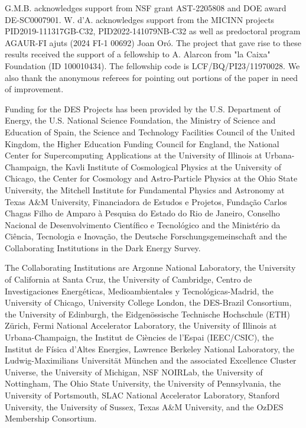 \documentclass[onecolumn,resetfootnote]{aastex7}
\begin{document}
  \begin{acknowledgments}
G.M.B. acknowledges support from NSF grant AST-2205808 and DOE award DE-SC0007901.
W. d’A. acknowledges support from the  MICINN projects PID2019-111317GB-C32, PID2022-141079NB-C32 as well as predoctoral program AGAUR-FI ajuts (2024 FI-1 00692) Joan Or\'o.
The project that gave rise to these results received the support of a fellowship
to A. Alarcon from "la Caixa" Foundation (ID 100010434). The fellowship code is
LCF/BQ/PI23/11970028.  We also thank the anonymous referees for pointing out
portions of the paper in need of improvement.

Funding for the DES Projects has been provided by the U.S. Department of Energy, the U.S. National Science Foundation, the Ministry of Science and Education of Spain, 
the Science and Technology Facilities Council of the United Kingdom, the Higher Education Funding Council for England, the National Center for Supercomputing 
Applications at the University of Illinois at Urbana-Champaign, the Kavli Institute of Cosmological Physics at the University of Chicago, 
the Center for Cosmology and Astro-Particle Physics at the Ohio State University,
the Mitchell Institute for Fundamental Physics and Astronomy at Texas A\&M University, Financiadora de Estudos e Projetos, 
Funda{\c c}{\~a}o Carlos Chagas Filho de Amparo {\`a} Pesquisa do Estado do Rio de Janeiro, Conselho Nacional de Desenvolvimento Cient{\'i}fico e Tecnol{\'o}gico and 
the Minist{\'e}rio da Ci{\^e}ncia, Tecnologia e Inova{\c c}{\~a}o, the Deutsche Forschungsgemeinschaft and the Collaborating Institutions in the Dark Energy Survey. 

The Collaborating Institutions are Argonne National Laboratory, the University of California at Santa Cruz, the University of Cambridge, Centro de Investigaciones Energ{\'e}ticas, 
Medioambientales y Tecnol{\'o}gicas-Madrid, the University of Chicago, University College London, the DES-Brazil Consortium, the University of Edinburgh, 
the Eidgen{\"o}ssische Technische Hochschule (ETH) Z{\"u}rich, 
Fermi National Accelerator Laboratory, the University of Illinois at Urbana-Champaign, the Institut de Ci{\`e}ncies de l'Espai (IEEC/CSIC), 
the Institut de F{\'i}sica d'Altes Energies, Lawrence Berkeley National Laboratory, the Ludwig-Maximilians Universit{\"a}t M{\"u}nchen and the associated Excellence Cluster Universe, 
the University of Michigan, NSF NOIRLab, the University of Nottingham, The Ohio State University, the University of Pennsylvania, the University of Portsmouth, 
SLAC National Accelerator Laboratory, Stanford University, the University of Sussex, Texas A\&M University, and the OzDES Membership Consortium.


\end{acknowledgments}
\end{document}
